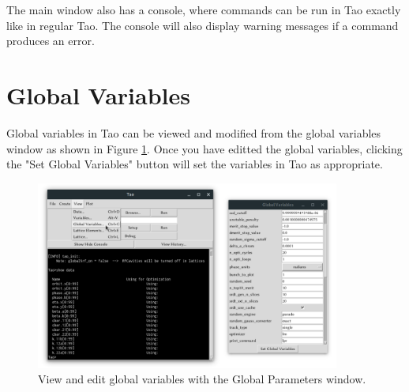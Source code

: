 The main window also has a console, where commands can be run in Tao exactly like in regular Tao.
The console will also display warning messages if a command produces an error.

\section{Global Variables}
\label{s:gui.global.variables}

Global variables in Tao can be viewed and modified from the global variables window as shown in Figure \ref{fig:gui.global.variables}.
Once you have editted the global variables, clicking the "Set Global Variables" button will set the variables in Tao as appropriate.

\begin{figure}
\centering
\includegraphics[width=10cm]{figures/globals.pdf}
\caption{View and edit global variables with the Global Parameters window.}
\label{fig:gui.global.variables}
\end{figure}

